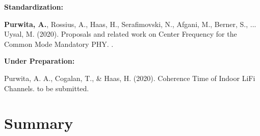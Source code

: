     \textbf{Standardization:}
    \begin{enumerate}[label={[\arabic*]}]
        \vspace{-1em}
        \setlength\itemsep{-0.5em}
        \item \sloppy
        \textbf{Purwita, A.}, Rossius, A., Haas, H., Serafimovski, N., Afgani, M., Berner, S., ... Uysal, M. (2020). Proposals and related work on Center Frequency for the Common Mode Mandatory PHY. .
    \end{enumerate}

    \textbf{Under Preparation:}
    \begin{enumerate}[label={[\arabic*]}]
        \item Purwita, A. A., Cogalan, T., \& Haas, H. (2020). Coherence Time of Indoor LiFi Channels. to be submitted.
    \end{enumerate}

\section{Summary}
    
    \lipsum[2]
